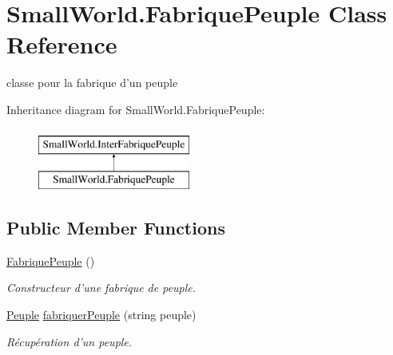 \hypertarget{class_small_world_1_1_fabrique_peuple}{\section{Small\-World.\-Fabrique\-Peuple Class Reference}
\label{class_small_world_1_1_fabrique_peuple}
}


classe pour la fabrique d'un peuple  


Inheritance diagram for Small\-World.\-Fabrique\-Peuple\-:\begin{figure}[H]
\begin{center}
\leavevmode
\includegraphics[height=2.000000cm]{class_small_world_1_1_fabrique_peuple}
\end{center}
\end{figure}
\subsection*{Public Member Functions}
\begin{DoxyCompactItemize}
\item 
\hypertarget{class_small_world_1_1_fabrique_peuple_a5fe5672eb02c7fb6f0aedccfe490b3b9}{\hyperlink{class_small_world_1_1_fabrique_peuple_a5fe5672eb02c7fb6f0aedccfe490b3b9}{Fabrique\-Peuple} ()}\label{class_small_world_1_1_fabrique_peuple_a5fe5672eb02c7fb6f0aedccfe490b3b9}

\begin{DoxyCompactList}\small\item\em Constructeur d'une fabrique de peuple. \end{DoxyCompactList}\item 
\hyperlink{class_small_world_1_1_peuple}{Peuple} \hyperlink{class_small_world_1_1_fabrique_peuple_ad3c21feceaebffdbfc0bdcb66edc4bdb}{fabriquer\-Peuple} (string peuple)
\begin{DoxyCompactList}\small\item\em Récupération d'un peuple. \end{DoxyCompactList}\end{DoxyCompactItemize}

